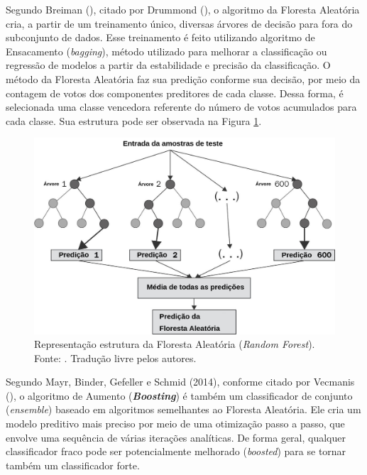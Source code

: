 Segundo Breiman (\citeyear{Breiman:2001:RF:570181.570182}), citado por Drummond (\citeyear{Drummond:2017}), o algoritmo da Floresta Aleatória cria, a partir de um treinamento único, diversas árvores de decisão para fora do subconjunto de dados. Esse treinamento é feito utilizando algoritmo de Ensacamento (\textit{bagging}), método utilizado para melhorar a classificação ou regressão de modelos a partir da estabilidade e precisão da classificação. O método da Floresta Aleatória faz sua predição conforme sua decisão, por meio da contagem de votos dos componentes preditores de cada classe. Dessa forma, é selecionada uma classe vencedora referente do número de votos acumulados para cada classe. Sua estrutura pode ser observada na Figura \ref{fig:random_forest}.

\begin{figure}[H]
    \centering
    \includegraphics[scale=0.3]{figuras/referencial_teorico/random_forest.png}
    \caption[Estrutura do random forest]{Representação estrutura da Floresta Aleatória (\textit{Random Forest}). Fonte: \cite{Chakure:2019}. Tradução livre pelos autores.}
    \label{fig:random_forest}
\end{figure}

Segundo Mayr, Binder, Gefeller e Schmid (2014), conforme citado por Vecmanis (\citeyear{Vecmanis:2019}), o algoritmo de Aumento (\textbf{\textit{Boosting}}) é também um classificador de conjunto (\textit{ensemble}) baseado em algoritmos semelhantes ao Floresta Aleatória. Ele cria um modelo preditivo mais preciso por meio de uma otimização passo a passo, que envolve uma sequência de várias iterações analíticas. De forma geral, qualquer classificador fraco pode ser potencialmente melhorado (\textit{boosted}) para se tornar também um classificador forte.

